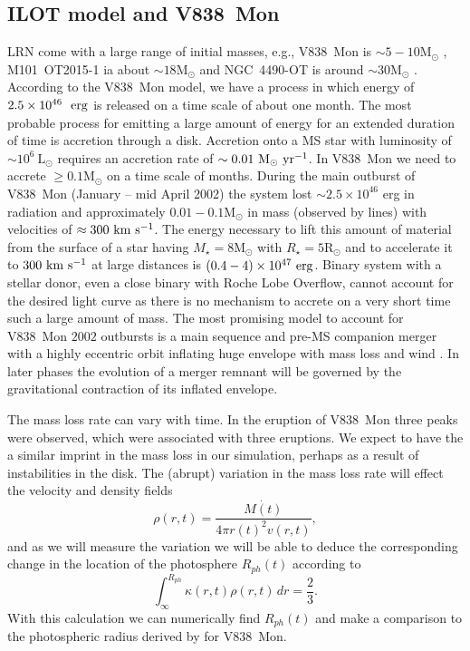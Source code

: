 \documentclass[modern]{aastex62}
\newcommand{\Lsun}{\mathrm{L_\odot}}
\newcommand{\Rsun}{\mathrm{R}_\odot}
\newcommand{\Msun}{\mathrm{M}_\odot}
\def \kms{~\rm{km~s^{-1}}}
\def \msyr{~\rm{M_{\odot}}~\rm{yr^{-1}}}
\def \erg{~\rm{erg}}
\begin{document}
\subsection{ILOT model and V838~Mon}
LRN come with a large range of initial masses, e.g., V838~Mon is $\sim5-10 \Msun$ \citep{2006A&A...451..223T}, M101~OT2015-1 ia about $\sim18 \Msun$   \citep{2017ApJ...834..107B} and NGC~4490-OT is around $\sim30 \Msun$ \citep{2016MNRAS.458..950S}.
According to the V838~Mon model, we have a process in which energy of $2.5 \times 10^{46}~\erg$ is released on a time scale of about one month.
The most probable process for emitting a large amount of energy for an extended duration of time is accretion through a disk.
Accretion onto a MS star with luminosity of $\sim 10^6 ~ \Lsun$ requires an accretion rate of $\sim 0.01 \msyr$.
In V838~Mon we need to accrete $\geq 0.1 \Msun$ on a time scale of months.
During the main outburst of V838~Mon (January -- mid April 2002) the system lost $\sim2.5\times10^{46}$ erg in radiation and approximately $0.01-0.1 \Msun$ in mass (observed by lines) with velocities of $\approx 300 \kms$.
The energy necessary to lift this amount of material from the surface of a star having $M_{\star}=8 \Msun$ with $R_{\star}=5 \Rsun$ and to accelerate it to $300 \kms$ at large distances is $(0.4-4)\times 10^{47} \erg$.
Binary system with a stellar donor, even a close binary with Roche Lobe Overflow, cannot account for the desired light curve as there is no mechanism to accrete on a very short time such a large amount of mass.
The most promising model to account for V838~Mon $2002$ outbursts is a main sequence and pre-MS companion merger with a highly eccentric orbit inflating huge envelope with mass loss and wind \citep[see][and within]{2006A&A...451..223T,2007ASPC..363..280S}.
In later phases the evolution of a merger remnant will be governed by the gravitational contraction of its inflated envelope.

The mass loss rate can vary with time. In the eruption of V838~Mon three peaks were observed, which were associated with three eruptions.
We expect to have the a similar imprint in the mass loss in our simulation, perhaps as a result of instabilities in the disk.
The (abrupt) variation in the mass loss rate will effect the velocity and density fields
\begin{equation}
    \rho(r,t)=\frac{\dot{M(t)}}{4 \pi r(t)^2 v(r,t)},
\end{equation}
and as we will measure the variation we will be able to deduce the corresponding change in the location of the photosphere $R_{ph}(t)$ according to
\begin{equation}
    \int_{\infty}^{R_{ph}} \kappa(r,t) \rho(r,t) \,dr = \frac{2}{3}.
\end{equation}
With this calculation we can numerically find $R_{ph}(t)$ and make a comparison to the photospheric radius derived by \cite{2005A&A...436.1009T} for V838~Mon.
\end{document}

